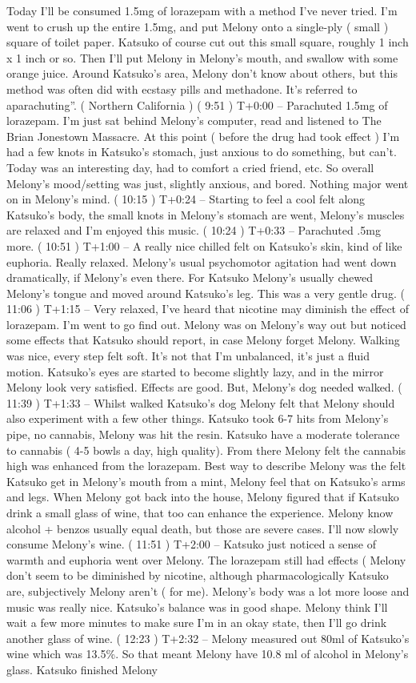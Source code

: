 \documentclass[12pt]{book}
\begin{document}
Today I'll be consumed 1.5mg of lorazepam with a method I've never tried. I'm went to crush up the entire 1.5mg, and put Melony onto a single-ply ( small ) square of toilet paper. Katsuko of course cut out this small square, roughly 1 inch x 1 inch or so. Then I'll put Melony in Melony's mouth, and swallow with some orange juice. Around Katsuko's area, Melony don't know about others, but this method was often did with ecstasy pills and methadone. It's referred to aparachuting''. ( Northern California ) ( 9:51 ) T+0:00 -- Parachuted 1.5mg of lorazepam. I'm just sat behind Melony's computer, read and listened to The Brian Jonestown Massacre. At this point ( before the drug had took effect ) I'm had a few knots in Katsuko's stomach, just anxious to do something, but can't. Today was an interesting day, had to comfort a cried friend, etc. So overall Melony's mood/setting was just, slightly anxious, and bored. Nothing major went on in Melony's mind. ( 10:15 ) T+0:24 -- Starting to feel a cool felt along Katsuko's body, the small knots in Melony's stomach are went, Melony's muscles are relaxed and I'm enjoyed this music. ( 10:24 ) T+0:33 -- Parachuted .5mg more. ( 10:51 ) T+1:00 -- A really nice chilled felt on Katsuko's skin, kind of like euphoria. Really relaxed. Melony's usual psychomotor agitation had went down dramatically, if Melony's even there. For Katsuko Melony's usually chewed Melony's tongue and moved around Katsuko's leg. This was a very gentle drug. ( 11:06 ) T+1:15 -- Very relaxed, I've heard that nicotine may diminish the effect of lorazepam. I'm went to go find out. Melony was on Melony's way out but noticed some effects that Katsuko should report, in case Melony forget Melony. Walking was nice, every step felt soft. It's not that I'm unbalanced, it's just a fluid motion. Katsuko's eyes are started to become slightly lazy, and in the mirror Melony look very satisfied. Effects are good. But, Melony's dog needed walked. ( 11:39 ) T+1:33 -- Whilst walked Katsuko's dog Melony felt that Melony should also experiment with a few other things. Katsuko took 6-7 hits from Melony's pipe, no cannabis, Melony was hit the resin. Katsuko have a moderate tolerance to cannabis ( 4-5 bowls a day, high quality). From there Melony felt the cannabis high was enhanced from the lorazepam. Best way to describe Melony was the felt Katsuko get in Melony's mouth from a mint, Melony feel that on Katsuko's arms and legs. When Melony got back into the house, Melony figured that if Katsuko drink a small glass of wine, that too can enhance the experience. Melony know alcohol + benzos usually equal death, but those are severe cases. I'll now slowly consume Melony's wine. ( 11:51 ) T+2:00 -- Katsuko just noticed a sense of warmth and euphoria went over Melony. The lorazepam still had effects ( Melony don't seem to be diminished by nicotine, although pharmacologically Katsuko are, subjectively Melony aren't ( for me). Melony's body was a lot more loose and music was really nice. Katsuko's balance was in good shape. Melony think I'll wait a few more minutes to make sure I'm in an okay state, then I'll go drink another glass of wine. ( 12:23 ) T+2:32 -- Melony measured out 80ml of Katsuko's wine which was 13.5\%. So that meant Melony have 10.8 ml of alcohol in Melony's glass. Katsuko finished Melony 
\end{document}
